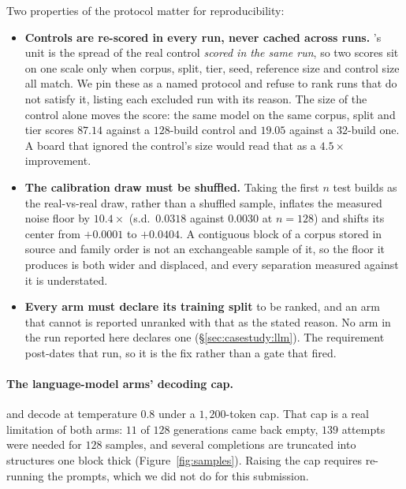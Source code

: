 
Two properties of the protocol matter for reproducibility:

\begin{itemize}[leftmargin=*,itemsep=1pt,topsep=2pt]
\item \textbf{Controls are re-scored in every run, never cached across runs.}
  \blockscore{}'s unit is the spread of the real control \emph{scored in the
  same run}, so two scores sit on one scale only when corpus, split, tier, seed,
  reference size and control size all match. We pin these as a named protocol
  and refuse to rank runs that do not satisfy it, listing each excluded run with
  its reason. The size of the control alone moves the score: the same model on
  the same corpus, split and tier scores $87.14$ against a $128$-build control
  and $19.05$ against a $32$-build one. A board that ignored the control's size
  would read that as a $4.5\times$ improvement.
\item \textbf{The calibration draw must be shuffled.} Taking the first $n$ test
  builds as the real-vs-real draw, rather than a shuffled sample, inflates the
  measured noise floor by $\mathbf{10.4\times}$ (s.d.\ $0.0318$ against $0.0030$
  at $n{=}128$) and shifts its center from $+0.0001$ to $+0.0404$. A contiguous
  block of a corpus stored in source and family order is not an exchangeable
  sample of it, so the floor it produces is both wider and displaced, and every
  separation measured against it is understated.
\item \textbf{Every arm must declare its training split} to be ranked, and an
  arm that cannot is reported unranked with that as the stated reason. No arm in
  the run reported here declares one (\S\ref{sec:casestudy:llm}). The
  requirement post-dates that run, so it is the fix rather than a gate that
  fired.
\end{itemize}

\paragraph{The language-model arms' decoding cap.} \llmft{} and \llmgeo{} decode at
temperature $0.8$ under a $1{,}200$-token cap. That cap is a real limitation of both arms:
$11$ of $128$ generations came back empty, $139$ attempts were needed for $128$ samples,
and several completions are truncated into structures one block thick
(Figure~\ref{fig:samples}). Raising the cap requires re-running the prompts, which we did
not do for this submission.

